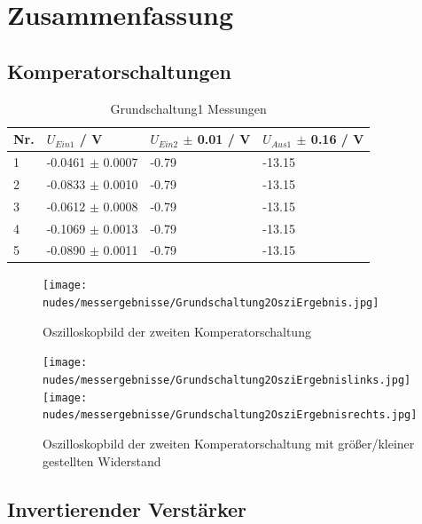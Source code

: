 \documentclass[12pt,a4paper,twoside]{article}
\begin{document}
\section{Zusammenfassung} %

\subsection{Komperatorschaltungen}

\begin{table}[H]
    \centering
    \caption{Grundschaltung1 Messungen}
    \label{tab:Grundschaltung1MessungenAW}
    \begin{tabular}{| l | l | l | l |}
        \hline
        Nr. & $U_{Ein1}$ / V & $U_{Ein2}$ $\pm$ 0.01 / V & $U_{Aus1}$ $\pm$ 0.16 / V \\
        \hline
        1 & -0.0461 $\pm$ 0.0007 & -0.79 & -13.15 \\
        2 & -0.0833 $\pm$ 0.0010 & -0.79 & -13.15 \\
        3 & -0.0612 $\pm$ 0.0008 & -0.79 & -13.15 \\
        4 & -0.1069 $\pm$ 0.0013 & -0.79 & -13.15 \\
        5 & -0.0890 $\pm$ 0.0011 & -0.79 & -13.15 \\
        \hline
    \end{tabular}
\end{table}

\begin{figure}[H]
    \centering
    \texttt{[image: nudes/messergebnisse/Grundschaltung2OsziErgebnis.jpg]}
    \caption{Oszilloskopbild der zweiten Komperatorschaltung}
    \label{fig:Grundschaltung2ErgebnissAW}
\end{figure}

\begin{figure}[H]
    \centering
    \texttt{[image: nudes/messergebnisse/Grundschaltung2OsziErgebnislinks.jpg]}
    \texttt{[image: nudes/messergebnisse/Grundschaltung2OsziErgebnisrechts.jpg]}
    \caption{Oszilloskopbild der zweiten Komperatorschaltung mit größer/kleiner gestellten Widerstand}
    \label{fig:Grundschaltung2ErgebnissPotiAW}
\end{figure}


\subsection{Invertierender Verstärker}
\end{document}
